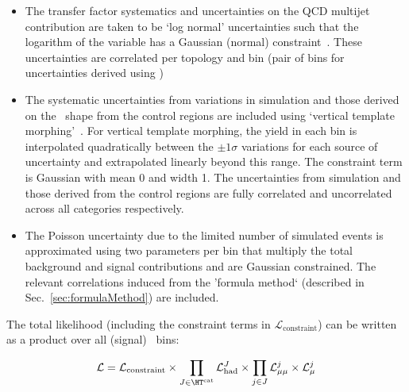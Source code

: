 \begin{itemize}
\item The transfer factor systematics and uncertainties on the QCD multijet contribution 
are taken to be `log normal' uncertainties such that the logarithm of the variable has 
a Gaussian (normal) constraint~\cite{templateMorphing}. These uncertainties are correlated per topology and \scalht bin 
(pair of \scalht bins for uncertainties derived using \mmj)
\item The systematic uncertainties from variations in simulation and those derived on the \mht~shape from the control regions 
are included using `vertical template morphing'~\cite{templateMorphing}. For vertical template morphing, the yield
in each bin is interpolated quadratically between the $\pm 1\sigma$ variations for each source of
uncertainty and extrapolated linearly beyond this range. The constraint term is Gaussian
with mean 0 and width 1. The uncertainties from simulation and those derived from the control regions
are fully correlated and uncorrelated across all categories respectively.
\item The Poisson uncertainty due to the limited number of simulated events is approximated using
two parameters per bin that multiply the total background and signal contributions and 
are Gaussian constrained. The relevant correlations induced from the 'formula method` (described in Sec.~\ref{sec:formulaMethod}) 
are included. 
\end{itemize}

The total likelihood (including the constraint terms in $\mathcal{L}_\mathrm{constraint}$) 
can be written as a product over all (signal) \htcat~bins:

\begin{equation}
\label{eq:totalLikelihood}
\mathcal{L} =  \mathcal{L}_\mathrm{constraint} \times \prod_{J\in\htcat} \mathcal{L}^{J}_{\mathrm{had}} \times  \prod_{j\in J} \mathcal{L}^{j}_{\mu\mu} 
\times \mathcal{L}^{j}_{\mu}
\end{equation}


